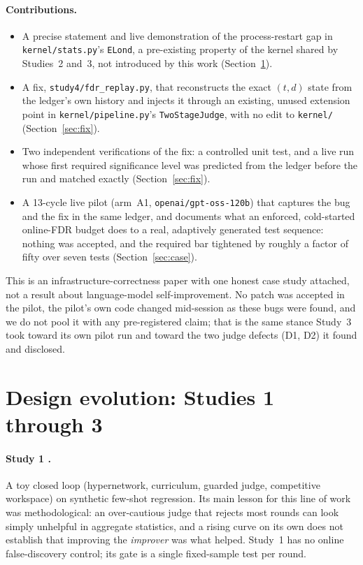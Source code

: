 \documentclass[11pt]{article}
\begin{document}
\paragraph{Contributions.}
\begin{itemize}\setlength\itemsep{1pt}
\item A precise statement and live demonstration of the process-restart gap in \texttt{kernel/stats.py}'s \texttt{ELond}, a pre-existing property of the kernel shared by Studies~2 and~3, not introduced by this work (Section~\ref{sec:evolution}).
\item A fix, \texttt{study4/fdr\_replay.py}, that reconstructs the exact $(t,d)$ state from the ledger's own history and injects it through an existing, unused extension point in \texttt{kernel/pipeline.py}'s \texttt{TwoStageJudge}, with no edit to \texttt{kernel/} (Section~\ref{sec:fix}).
\item Two independent verifications of the fix: a controlled unit test, and a live run whose first required significance level was predicted from the ledger before the run and matched exactly (Section~\ref{sec:fix}).
\item A 13-cycle live pilot (arm~A1, \texttt{openai/gpt-oss-120b}) that captures the bug and the fix in the same ledger, and documents what an enforced, cold-started online-FDR budget does to a real, adaptively generated test sequence: nothing was accepted, and the required bar tightened by roughly a factor of fifty over seven tests (Section~\ref{sec:case}).
\end{itemize}

This is an infrastructure-correctness paper with one honest case study attached, not a result about language-model self-improvement. No patch was accepted in the pilot, the pilot's own code changed mid-session as these bugs were found, and we do not pool it with any pre-registered claim; that is the same stance Study~3 took toward its own pilot run and toward the two judge defects (D1, D2) it found and disclosed.

\section{Design evolution: Studies 1 through 3}
\label{sec:evolution}

\paragraph{Study 1 \citep{ouadoukou2026study1}.} A toy closed loop (hypernetwork, curriculum, guarded judge, competitive workspace) on synthetic few-shot regression. Its main lesson for this line of work was methodological: an over-cautious judge that rejects most rounds can look simply unhelpful in aggregate statistics, and a rising curve on its own does not establish that improving the \emph{improver} was what helped. Study~1 has no online false-discovery control; its gate is a single fixed-sample test per round.
\end{document}
